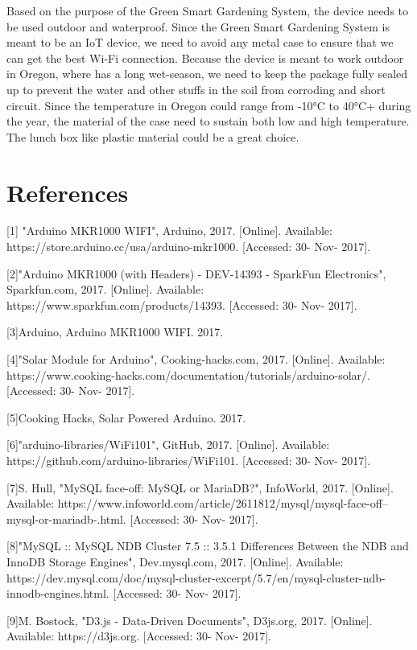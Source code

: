 \documentclass[IEEEtran,letterpaper,10pt,titlepage,fleqn,draftclsnofoot,onecolumn]{article}
\begin{document}
Based on the purpose of the Green Smart Gardening System, the device needs to be used outdoor and waterproof. Since the Green Smart Gardening System is meant to be an IoT device, we need to avoid any metal case to ensure that we can get the best Wi-Fi connection. Because the device is meant to work outdoor in Oregon, where has a long wet-season, we need to keep the package fully sealed up to prevent the water and other stuffs in the soil from corroding and short circuit. Since the temperature in Oregon could range from -10°C to 40°C+ during the year, the material of the case need to sustain both low and high temperature. The lunch box like plastic material could be a great choice. 

\clearpage

\section{References}
[1] "Arduino MKR1000 WIFI", Arduino, 2017. [Online]. Available: https://store.arduino.cc/usa/arduino-mkr1000. [Accessed: 30- Nov- 2017].

\vspace{1mm}

[2]"Arduino MKR1000 (with Headers) - DEV-14393 - SparkFun Electronics", Sparkfun.com, 2017. [Online]. Available: https://www.sparkfun.com/products/14393. [Accessed: 30- Nov- 2017].

\vspace{1mm}

[3]Arduino, Arduino MKR1000 WIFI. 2017.

\vspace{1mm}

[4]"Solar Module for Arduino", Cooking-hacks.com, 2017. [Online]. Available: https://www.cooking-hacks.com/documentation/tutorials/arduino-solar/. [Accessed: 30- Nov- 2017].

\vspace{1mm}

[5]Cooking Hacks, Solar Powered Arduino. 2017.

\vspace{1mm}

[6]"arduino-libraries/WiFi101", GitHub, 2017. [Online]. Available: https://github.com/arduino-libraries/WiFi101. [Accessed: 30- Nov- 2017].

\vspace{1mm}

[7]S. Hull, "MySQL face-off: MySQL or MariaDB?", InfoWorld, 2017. [Online]. Available: https://www.infoworld.com/article/2611812/mysql/mysql-face-off--mysql-or-mariadb-.html. [Accessed: 30- Nov- 2017].

\vspace{1mm}

[8]"MySQL :: MySQL NDB Cluster 7.5 :: 3.5.1 Differences Between the NDB and InnoDB Storage Engines", Dev.mysql.com, 2017. [Online]. Available: https://dev.mysql.com/doc/mysql-cluster-excerpt/5.7/en/mysql-cluster-ndb-innodb-engines.html. [Accessed: 30- Nov- 2017].

\vspace{1mm}

[9]M. Bostock, "D3.js - Data-Driven Documents", D3js.org, 2017. [Online]. Available: https://d3js.org. [Accessed: 30- Nov- 2017].
\end{document}
